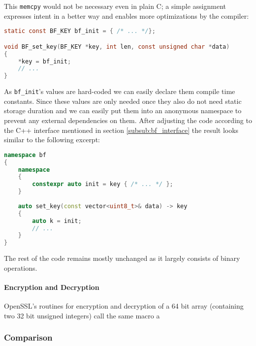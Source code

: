 This \texttt{memcpy} would not be necessary even in plain C; a simple assignment expresses intent in a better way and enables more optimizations by the compiler:

\begin{lstlisting}[language=C]
static const BF_KEY bf_init = { /* ... */};

void BF_set_key(BF_KEY *key, int len, const unsigned char *data)
{
    *key = bf_init;
    // ...
}
\end{lstlisting}

As \texttt{bf\_init}'s values are hard-coded we can easily declare them compile time constants. Since these values are only needed once they also do not need static storage duration and we can easily put them into an anonymous namespace to prevent any external dependencies on them. After adjusting the code according to the C++ interface mentioned in section \ref{subsub:bf_interface} the result looks similar to the following excerpt:

\begin{lstlisting}[language=C++]
namespace bf
{
    namespace
    {
        constexpr auto init = key { /* ... */ };
    }
    
    auto set_key(const vector<uint8_t>& data) -> key
    {
        auto k = init;
        // ...
    }
}
\end{lstlisting}

The rest of the code remains mostly unchanged as it largely consists of binary operations.

\paragraph{Encryption and Decryption}

OpenSSL's routines for encryption and decryption of a 64 bit array (containing two 32 bit unsigned integers) call the same macro a 

\subsubsection{Comparison}